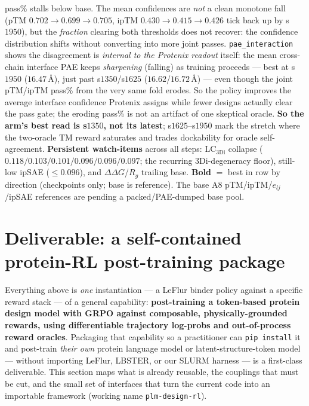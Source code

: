 \documentclass[11pt]{article}
\newcommand{\ttk}[1]{\texttt{\small #1}}
\begin{document}
\begin{table}[htbp]
{pass\% stalls below base. The mean confidences are \emph{not} a clean monotone fall (pTM
$0.702\!\to\!0.699\!\to\!\mathbf{0.705}$, ipTM $0.430\!\to\!0.415\!\to\!0.426$ tick back up by s$1950$), but the
\emph{fraction} clearing both thresholds does not recover: the confidence distribution shifts without converting
into more joint passes. \ttk{pae\_interaction} shows the disagreement is \emph{internal to the Protenix readout}
itself: the mean cross-chain interface PAE keeps \emph{sharpening} (falling) as training proceeds --- best at
s$1950$ ($\mathbf{16.47}$\,\AA), just past s$1350$/s$1625$ ($16.62$/$16.72$\,\AA) --- even though the joint
pTM/ipTM pass\% from the very same fold erodes. So the policy improves the average interface confidence Protenix
assigns while fewer designs actually clear the pass gate; the eroding pass\% is not an artifact of one skeptical
oracle. \textbf{So the arm's best read is s$1350$, not
its latest}; s$1625$--s$1950$ mark the stretch where the two-oracle TM reward saturates and trades dockability
for oracle self-agreement. \textbf{Persistent watch-items} across all steps: $\mathrm{LC}_{\mathrm{3Di}}$ collapse
($0.118/0.103/0.101/0.096/0.096/0.097$; the recurring 3Di-degeneracy floor), still-low ipSAE ($\le\!0.096$), and
$\Delta\Delta G$/$R_g$ trailing base. \textbf{Bold} $=$ best in row by direction (checkpoints only; base is
reference). The base A8 pTM/ipTM/$e_{lj}$/ipSAE references are pending a packed/PAE-dumped base pool.}
\label{tab:twooracletable6}
\end{table}

\section{Deliverable: a self-contained protein-RL post-training package}
\label{sec:package}
Everything above is \emph{one} instantiation --- a LeFlur binder policy against a specific reward
stack --- of a general capability: \textbf{post-training a token-based protein design model with GRPO
against composable, physically-grounded rewards, using differentiable trajectory log-probs and
out-of-process reward oracles}. Packaging that capability so a practitioner can \ttk{pip install} it
and post-train \emph{their own} protein language model or latent-structure-token model --- without
importing LeFlur, LBSTER, or our SLURM harness --- is a first-class deliverable. This section maps
what is already reusable, the couplings that must be cut, and the small set of interfaces that turn
the current code into an importable framework (working name \ttk{plm-design-rl}).
\end{document}
